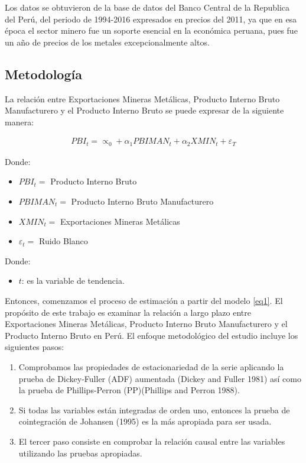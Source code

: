 \documentclass[11pt,]{article}
\providecommand{\tightlist}{%
\setlength{\itemsep}{0pt}\setlength{\parskip}{0pt}}
\begin{document}
Los datos se obtuvieron de la base de datos del Banco Central de la
Republica del Perú, del periodo de 1994-2016 expresados en precios del
2011, ya que en esa época el sector minero fue un soporte esencial en la
económica peruana, pues fue un año de precios de los metales
excepcionalmente altos.

\hypertarget{metodologia}{%
\subsection{Metodología}\label{metodologia}}

La relación entre Exportaciones Mineras Metálicas, Producto Interno
Bruto Manufacturero y el Producto Interno Bruto se puede expresar de la
siguiente manera:

\begin{eqnarray}\label{eq1}
PBI_t=\propto_0+\alpha_1PBIMAN_t+\alpha_2XMIN_t+\varepsilon_T     
\end{eqnarray}

Donde:

\begin{itemize}
\tightlist
\item
  \({PBI}_t =\) Producto Interno Bruto
\item
  \({PBIMAN}_t =\) Producto Interno Bruto Manufacturero
\item
  \({XMIN}_t =\) Exportaciones Mineras Metálicas
\item
  \(\varepsilon_t =\) Ruido Blanco
\end{itemize}

Donde:

\begin{itemize}
\tightlist
\item
  \(t\): es la variable de tendencia.
\end{itemize}

Entonces, comenzamos el proceso de estimación a partir del modelo
\ref{eq1}. El propósito de este trabajo es examinar la relación a largo
plazo entre Exportaciones Mineras Metálicas, Producto Interno Bruto
Manufacturero y el Producto Interno Bruto en Perú. El enfoque
metodológico del estudio incluye los siguientes pasos:

\begin{enumerate}
\def\labelenumi{\arabic{enumi}.}
\tightlist
\item
  Comprobamos las propiedades de estacionariedad de la serie aplicando
  la prueba de Dickey-Fuller (ADF) aumentada (Dickey and Fuller 1981)
  así como la prueba de Phillips-Perron (PP)(Phillips and Perron 1988).
\item
  Si todas las variables están integradas de orden uno, entonces la
  prueba de cointegración de Johansen (1995) es la más apropiada para
  ser usada.
\item
  El tercer paso consiste en comprobar la relación causal entre las
  variables utilizando las pruebas apropiadas.
\end{enumerate}
\end{document}
